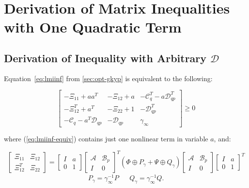 
\chapter{Derivation of Matrix Inequalities with One Quadratic Term}
\label{sec:apd-a}

\section{Derivation of  Inequality with Arbitrary $\mathcal{D}$}
\label{sec:apd-a-1}

\begin{thm}
	Equation~\ref{eq:lmiinf} from \autoref{sec:opt-gkyp} is equivalent to the following:
	
	\begin{equation} \label{eq:lmiinf-equiv}
		\begin{bmatrix}
			-\Xi_{11} + aa^T & -\Xi_{12} + a & -\mathcal{C}_q^T - a\mathcal{D}_{qp}^T \\
			-\Xi_{12}^T + a^T & -\Xi_{22} + 1 & -\mathcal{D}_{qp}^T \\
			-\mathcal{C}_q - a^T\mathcal{D}_{qp} & -\mathcal{D}_{qp} & \gamma_\infty
		\end{bmatrix} \geq 0
	\end{equation}
	
	where (\ref{eq:lmiinf-equiv}) contains just one nonlinear term in variable $a$, and:
	
	\begin{equation*}
		\begin{bmatrix}
			\Xi_{11} & \Xi_{12} \\
			\Xi_{12}^T & \Xi_{22}
		\end{bmatrix} =
		\begin{bmatrix}
			I & a \\
			0 & 1
		\end{bmatrix}
		\begin{bmatrix}
			\mathcal{A} & \mathcal{B}_p \\
			I & 0
		\end{bmatrix}^T
		\left(\Phi \oplus P_\gamma + \Psi \oplus Q_\gamma\right)
		\begin{bmatrix}
			\mathcal{A} & \mathcal{B}_p \\
			I & 0
		\end{bmatrix} 
		\begin{bmatrix}
			I & a \\
			0 & 1
		\end{bmatrix}^T
	\end{equation*}
	\begin{align} \label{eq:pq}
		P_\gamma = \gamma_\infty^{-1}P && Q_\gamma = \gamma_\infty^{-1}Q.
	\end{align}
\end{thm}

